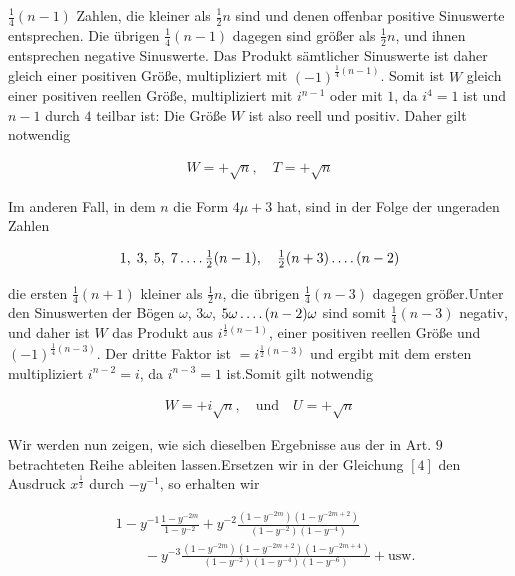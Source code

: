 $\frac14(n-1)$ Zahlen, die kleiner als $\frac12n$ sind und denen offenbar positive Sinuswerte entsprechen. Die übrigen $\frac14(n-1)$ dagegen sind größer als $\frac12n$, und ihnen entsprechen negative Sinuswerte. Das Produkt sämtlicher Sinuswerte ist daher gleich einer positiven Größe, multipliziert mit $(-1)^{\frac14(n-1)}$. Somit ist $W$ gleich einer positiven reellen Größe, multipliziert mit $i^{n-1}$ oder mit $1$, da $i^4=1$ ist und $n-1$ durch $4$ teilbar ist: Die Größe $W$ ist also reell und positiv. Daher gilt notwendig

\[
\begin{aligned}
W=+\surd n,\quad T=+\surd n
\end{aligned}
\]

Im anderen Fall, in dem $n$ die Form $4\mu+3$ hat, sind in der Folge der ungeraden Zahlen

\[
\begin{aligned}
1,\;3,\;5,\;7\mathinner{.\,.\,.\,.}\tfrac12(n-1),\quad\tfrac12(n+3)\mathinner{.\,.\,.\,.}(n-2)
\end{aligned}
\]

die ersten $\frac14(n+1)$ kleiner als $\frac12n$, die übrigen $\frac14(n-3)$ dagegen größer.\quad Unter den Sinuswerten der Bögen $\omega$, $3\omega$, $5\omega\mathinner{.\,.\,.\,.}(n-2)\omega$ sind somit $\frac14(n-3)$ negativ, und daher ist $W$ das Produkt aus $i^{\frac12(n-1)}$, einer positiven reellen Größe und $(-1)^{\frac14(n-3)}$. Der dritte Faktor ist $=i^{\frac12(n-3)}$ und ergibt mit dem ersten multipliziert $i^{n-2}=i$, da $i^{n-3}=1$ ist.\quad Somit gilt notwendig

\[
\begin{aligned}
W=+i\surd n,\quad\text{und}\quad U=+\surd n
\end{aligned}
\]


Wir werden nun zeigen, wie sich dieselben Ergebnisse aus der in Art. $9$ betrachteten Reihe ableiten lassen.\quad Ersetzen wir in der Gleichung $[4]$ den Ausdruck $x^{\frac12}$ durch $-y^{-1}$, so erhalten wir


\[
\begin{aligned}
&1-y^{-1}\frac{1-y^{-2m}}{1-y^{-2}}+y^{-2}\frac{(1-y^{-2m})(1-y^{-2m+2})}{(1-y^{-2})(1-y^{-4})}\\&\qquad-y^{-3}\frac{(1-y^{-2m})(1-y^{-2m+2})(1-y^{-2m+4})}{(1-y^{-2})(1-y^{-4})(1-y^{-6})}+\text{usw.}
\end{aligned}
\]


